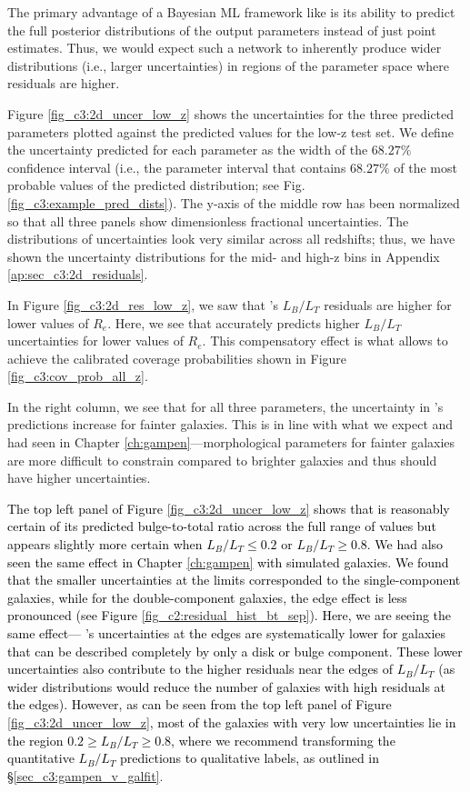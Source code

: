 The primary advantage of a Bayesian ML framework like \gampen{} is its ability to predict the full posterior distributions of the output parameters instead of just point estimates. Thus, we would expect such a network to inherently produce wider distributions (i.e., larger uncertainties) in regions of the parameter space where residuals are higher. 

Figure \ref{fig_c3:2d_uncer_low_z} shows the uncertainties for the three predicted parameters plotted against the predicted values for the low-z test set. We define the uncertainty predicted for each parameter as the width of the $68.27\%$ confidence interval (i.e., the parameter interval that contains $68.27\%$ of the most probable values of the predicted distribution; see Fig.\,\ref{fig_c3:example_pred_dists}). The y-axis of the middle row has been normalized so that all three panels show dimensionless fractional uncertainties. The distributions of uncertainties look very similar across all redshifts; thus, we have shown the uncertainty distributions for the mid- and high-z bins in Appendix \ref{ap:sec_c3:2d_residuals}.

In Figure \ref{fig_c3:2d_res_low_z}, we saw that \gampen{}'s $L_B/L_T$ residuals are higher for lower values of $R_e$. Here, we see that \gampen{} accurately predicts higher $L_B/L_T$ uncertainties for lower values of $R_e$. This compensatory effect is what allows \gampen{} to achieve the calibrated coverage probabilities shown in Figure \ref{fig_c3:cov_prob_all_z}. 

In the right column, we see that for all three parameters, the uncertainty in \gampen{}'s predictions increase for fainter galaxies. This is in line with what we expect and had seen in Chapter \ref{ch:gampen}---morphological parameters for fainter galaxies are more difficult to constrain compared to brighter galaxies and thus should have higher uncertainties. 

\textcolor{black}{The top left panel of Figure \ref{fig_c3:2d_uncer_low_z} shows that \gampen{} is reasonably certain of its predicted %
bulge-to-total ratio across the full range of values but appears slightly more certain when $L_B/L_T \leq 0.2$ or $L_B/L_T \geq 0.8$. We had also seen the same effect in Chapter \ref{ch:gampen} with simulated galaxies. We found that the smaller uncertainties at the limits corresponded to the single-component galaxies, while for the double-component galaxies, the edge effect is less pronounced (see Figure \ref{fig_c2:residual_hist_bt_sep}). Here, we are seeing the same effect--- \gampen{}'s uncertainties at the edges are systematically lower for galaxies that can be described completely by only a disk or bulge component. These lower uncertainties also contribute to the higher residuals near the edges of $L_B/L_T$ (as wider distributions would reduce the number of galaxies with high residuals at the edges). However, as can be seen from the top left panel of Figure \ref{fig_c3:2d_uncer_low_z}, most of the galaxies with very low uncertainties lie in the region $0.2 \geq L_B/L_T \geq 0.8$, where we recommend transforming the quantitative $L_B/L_T$ predictions to qualitative labels, as outlined in \S \ref{sec_c3:gampen_v_galfit}}.

